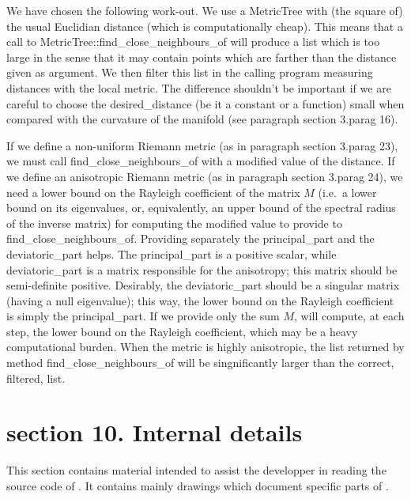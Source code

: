 {We have chosen the following work-out.
We use a {\codett MetricTree} with (the square of) the usual Euclidian distance (which is
computationally cheap).
This means that a call to {\codett MetricTree::find\_close\_neighbours\_of} will produce a list
which is too large in the sense that it may contain points which are farther than the
distance given as argument.
We then filter this list in the calling program measuring distances with the local metric.
The difference shouldn't be important if we are careful to choose the {\codett
desired\_distance} (be it a constant or a function) small when compared with the curvature
of the manifold (see paragraph \numb section 3.\numb parag 16).

If we define a non-uniform Riemann metric (as in paragraph \numb section 3.\numb parag 23),
we must call {\codett find\_close\_neighbours\_of} with a modified value of the
distance.
If we define an anisotropic Riemann metric (as in paragraph \numb section 3.\numb parag 24),
we need a lower bound on the Rayleigh coefficient of the matrix $M$ (i.e.\ a lower bound
on its eigenvalues, or, equivalently, an upper bound of the spectral radius of the inverse
matrix) for computing the modified value to provide to {\codett find\_close\_neighbours\_of}.
Providing separately the {\codett principal\_part} and the {\codett deviatoric\_part} helps.
The {\codett principal\_part} is a positive scalar, while {\codett deviatoric\_part} is
a matrix responsible for the anisotropy; this matrix should be semi-definite positive.
Desirably, the {\codett deviatoric\_part} should be a singular matrix (having a null eigenvalue);
this way, the lower bound on the Rayleigh coefficient is simply the {\codett principal\_part}.
If we provide only the sum $M$, {\maniFEM} will compute, at each step, the lower bound on the
Rayleigh coefficient, which may be a heavy computational burden.
When the metric is highly anisotropic, the list returned by method
{\codett find\_close\_neighbours\_of} will be singnificantly larger than the correct, filtered, list.




\section{\numb section 10. Internal details}

This section contains material intended to assist the developper in reading the source code
of \maniFEM.
It contains mainly drawings which document specific parts of \maniFEM.

}
